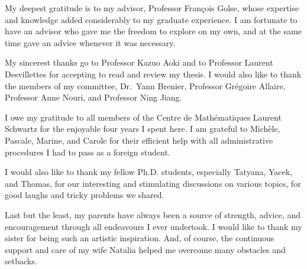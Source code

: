 My deepest gratitude is to my advisor, Professor François Golse, whose expertise and knowledge added considerably to my graduate experience. I am fortunate to have an advisor who gave me the freedom to explore on my own, and at the same time gave an advice whenever it was necessary.

My sincerest thanks go to Professor Kazuo Aoki and to Professor Laurent Desvillettes for accepting to read and review my thesis. I would also like to thank the members of my committee, Dr.\ Yann Brenier, Professor Grégoire Allaire, Professor Anne Nouri, and Professor Ning Jiang.

I owe my gratitude to all members of the Centre de Mathématiques Laurent Schwartz for the enjoyable four years I spent here. I am grateful to Michèle, Pascale, Marine, and Carole for their efficient help with all administrative procedures I had to pass as a foreign student.

I would also like to thank my fellow Ph.D. students, especially Tatyana, Yacek, and Thomas, for our interesting and stimulating discussions on various topics, for good laughs and tricky problems we shared.

Last but the least, my parents have always been a source of strength, advice, and encouragement through all endeavours I ever undertook. I would like to thank my sister for being such an artistic inspiration. And, of course, the continuous support and care of my wife Natalia helped me overcome many obstacles and setbacks.
